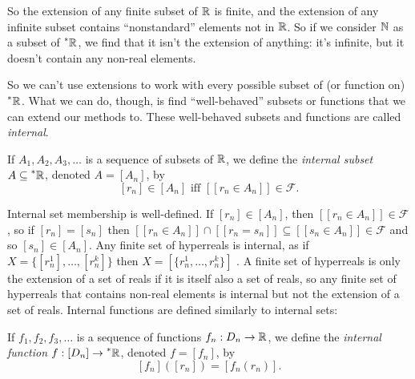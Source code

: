 So the extension of any finite subset of $\mathbb{R}$ is finite, and the extension of any infinite subset contains ``nonstandard'' elements not in $\mathbb{R}$. So if we consider $\mathbb{N}$ as a subset of $\prescript{*}{}{\mathbb{R}}$, we find that it isn't the extension of anything: it's infinite, but it doesn't contain any non-real elements.

So we can't use extensions to work with every possible subset of (or function on) $\prescript{*}{}{\mathbb{R}}$. What we can do, though, is find ``well-behaved'' subsets or functions that we can extend our methods to. These well-behaved subsets and functions are called \textit{internal}.

\begin{defn}
    If $A_1, A_2, A_3, \ldots$ is a sequence of subsets of $\mathbb{R}$, we define the \textit{internal subset} $A \subseteq \prescript{*}{}{\mathbb{R}}$, denoted $A = [A_n]$, by
    \[ [r_n] \in [A_n] \text{ iff } [[r_n \in A_n]] \in \mathcal{F}. \]
\end{defn}

Internal set membership is well-defined. If $[r_n] \in [A_n]$, then $[[r_n \in A_n]] \in \mathcal{F}$, so if $[r_n] = [s_n]$ then $[[r_n \in A_n]] \cap [[r_n = s_n]] \subseteq [[s_n \in A_n]] \in \mathcal{F}$ and so $[s_n] \in [A_n]$. Any finite set of hyperreals is internal, as if $X = \{[r_n^1], \ldots, [r_n^k]\}$ then $X = [\{r_n^1, \ldots, r_n^k\}]$ \cite[126]{goldblatt1998}. A finite set of hyperreals is only the extension of a set of reals if it is itself also a set of reals, so any finite set of hyperreals that contains non-real elements is internal but not the extension of a set of reals. Internal functions are defined similarly to internal sets:

\begin{defn}
    If $f_1, f_2, f_3, \ldots$ is a sequence of functions $f_n: D_n \to \mathbb{R}$, we define the \textit{internal function} $f: [D_n] \to \prescript{*}{}{\mathbb{R}}$, denoted $f = [f_n]$, by
    \[ [f_n]([r_n]) = [f_n(r_n)]. \]
\end{defn}




